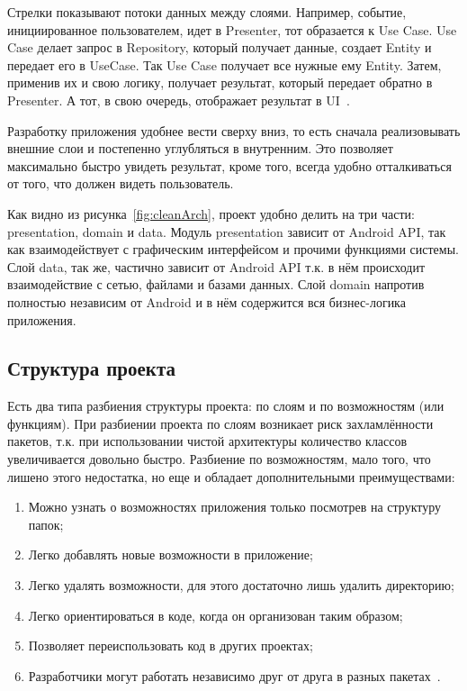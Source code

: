 Стрелки показывают потоки данных между слоями.
Например, событие, инициированное пользователем, идет в Presenter, тот образается к Use Case.
Use Case делает запрос в Repository, который получает данные, создает Entity и передает его в UseCase.
Так Use Case получает все нужные ему Entity.
Затем, применив их и свою логику, получает результат, который передает обратно в Presenter.
А тот, в свою очередь, отображает результат в UI~\cite{habr:clean}.

Разработку приложения удобнее вести сверху вниз, то есть сначала реализовывать внешние слои и постепенно углубляться в внутренним.
Это позволяет максимально быстро увидеть результат, кроме того, всегда удобно отталкиваться от того, что должен видеть пользователь.

Как видно из рисунка~\ref{fig:cleanArch}, проект удобно делить на три части: presentation, domain и data.
Модуль presentation зависит от Android API, так как взаимодействует с графическим интерфейсом и прочими функциями системы.
Слой data, так же, частично зависит от Android API т.к. в нём происходит взаимодействие с сетью, файлами и базами данных.
Слой domain напротив полностью независим от Android и в нём содержится вся бизнес-логика приложения.

\subsection{Структура проекта}
\label{subsec:struct}

Есть два типа разбиения структуры проекта: по слоям и по возможностям (или функциям).
При разбиении проекта по слоям возникает риск захламлённости пакетов, т.к. при использовании чистой архитектуры количество классов увеличивается довольно быстро.
Разбиение по возможностям, мало того, что лишено этого недостатка, но еще и обладает дополнительными преимуществами:
\begin{enumerate}
  \item Можно узнать о возможностях приложения только посмотрев на структуру папок;
  \item Легко добавлять новые возможности в приложение;
  \item Легко удалять возможности, для этого достаточно лишь удалить директорию;
  \item Легко ориентироваться в коде, когда он организован таким образом;
  \item Позволяет переиспользовать код в других проектах;
  \item Разработчики могут работать независимо друг от друга в разных пакетах~\cite{medium:pbf}.
\end{enumerate}

